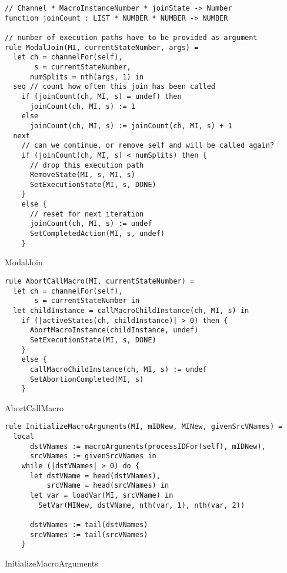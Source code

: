 \begin{listing}[H]
\begin{verbatim}
// Channel * MacroInstanceNumber * joinState -> Number
function joinCount : LIST * NUMBER * NUMBER -> NUMBER

// number of execution paths have to be provided as argument
rule ModalJoin(MI, currentStateNumber, args) =
  let ch = channelFor(self),
       s = currentStateNumber,
      numSplits = nth(args, 1) in
  seq // count how often this join has been called
    if (joinCount(ch, MI, s) = undef) then
      joinCount(ch, MI, s) := 1
    else
      joinCount(ch, MI, s) := joinCount(ch, MI, s) + 1
  next
    // can we continue, or remove self and will be called again?
    if (joinCount(ch, MI, s) < numSplits) then {
      // drop this execution path
      RemoveState(MI, s, MI, s)
      SetExecutionState(MI, s, DONE)
    }
    else {
      // reset for next iteration
      joinCount(ch, MI, s) := undef
      SetCompletedAction(MI, s, undef)
    }
\end{verbatim}
\caption{ModalJoin}
\label{lst:asm:ModalJoin}
\end{listing}




\begin{listing}[H]
\begin{verbatim}
rule AbortCallMacro(MI, currentStateNumber) =
  let ch = channelFor(self),
       s = currentStateNumber in
  let childInstance = callMacroChildInstance(ch, MI, s) in
    if (|activeStates(ch, childInstance)| > 0) then {
      AbortMacroInstance(childInstance, undef)
      SetExecutionState(MI, s, DONE)
    }
    else {
      callMacroChildInstance(ch, MI, s) := undef
      SetAbortionCompleted(MI, s)
    }
\end{verbatim}
\caption{AbortCallMacro}
\label{lst:asm:AbortCallMacro}
\end{listing}




\begin{listing}[H]
\begin{verbatim}
rule InitializeMacroArguments(MI, mIDNew, MINew, givenSrcVNames) =
  local
      dstVNames := macroArguments(processIDFor(self), mIDNew),
      srcVNames := givenSrcVNames in
    while (|dstVNames| > 0) do {
      let dstVName = head(dstVNames),
          srcVName = head(srcVNames) in
      let var = loadVar(MI, srcVName) in
        SetVar(MINew, dstVName, nth(var, 1), nth(var, 2))

      dstVNames := tail(dstVNames)
      srcVNames := tail(srcVNames)
    }
\end{verbatim}
\caption{InitializeMacroArguments}
\label{lst:asm:InitializeMacroArguments}
\end{listing}




